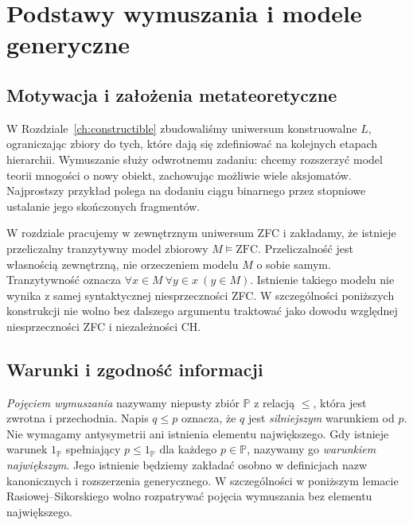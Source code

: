 \chapter{Podstawy wymuszania i modele generyczne}\label{ch:forcing-foundations}
\section{Motywacja i założenia metateoretyczne}
W Rozdziale~\ref{ch:constructible} zbudowaliśmy uniwersum
konstruowalne $L$, ograniczając zbiory do tych, które dają się
zdefiniować na kolejnych etapach hierarchii. Wymuszanie służy
odwrotnemu zadaniu: chcemy rozszerzyć model teorii mnogości
o nowy obiekt, zachowując możliwie wiele aksjomatów.
Najprostszy przykład polega na dodaniu ciągu binarnego
przez stopniowe ustalanie jego skończonych fragmentów.

\begin{uwaga}\label{rem:forcing-background}
W rozdziale pracujemy w zewnętrznym uniwersum ZFC i zakładamy,
że istnieje przeliczalny tranzytywny model zbiorowy
$M\models\mathrm{ZFC}$. Przeliczalność jest własnością
zewnętrzną, nie orzeczeniem modelu $M$ o sobie samym.
Tranzytywność oznacza
$\forall x\in M\ \forall y\in x\ (y\in M)$.
Istnienie takiego modelu nie wynika z samej syntaktycznej
niesprzeczności ZFC. W szczególności poniższych konstrukcji
nie wolno bez dalszego argumentu traktować jako dowodu
względnej niesprzeczności ZFC i niezależności CH.
\end{uwaga}

\section{Warunki i zgodność informacji}
\begin{definicja}\label{def:forcing-poset}
\emph{Pojęciem wymuszania} nazywamy niepusty zbiór
$\mathbb P$ z relacją $\leq$, która jest zwrotna
i przechodnia. Napis $q\leq p$ oznacza, że $q$ jest
\emph{silniejszym} warunkiem od $p$.
Nie wymagamy antysymetrii ani istnienia
elementu największego. Gdy istnieje warunek
$1_{\mathbb P}$ spełniający
$p\leq1_{\mathbb P}$ dla każdego $p\in\mathbb P$,
nazywamy go \emph{warunkiem największym}.
Jego istnienie będziemy zakładać osobno
w definicjach nazw kanonicznych i rozszerzenia
generycznego. W szczególności w poniższym lemacie
Rasiowej--Sikorskiego wolno rozpatrywać
pojęcia wymuszania bez
elementu największego.
\end{definicja}

